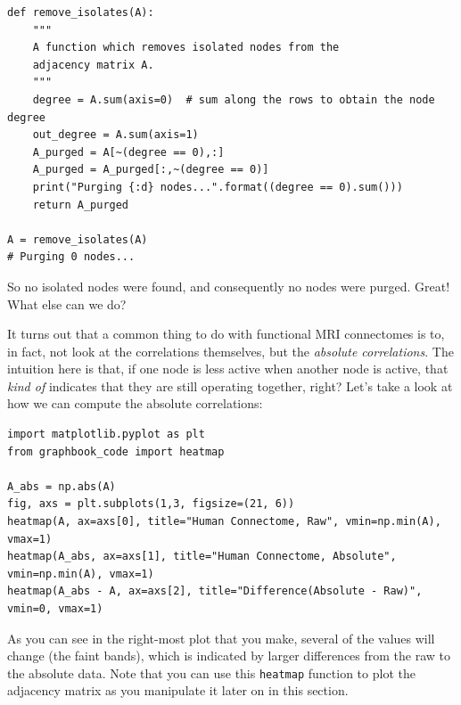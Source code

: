 \begin{lstlisting}[style=python]
def remove_isolates(A):
    """
    A function which removes isolated nodes from the 
    adjacency matrix A.
    """
    degree = A.sum(axis=0)  # sum along the rows to obtain the node degree
    out_degree = A.sum(axis=1)
    A_purged = A[~(degree == 0),:]
    A_purged = A_purged[:,~(degree == 0)]
    print("Purging {:d} nodes...".format((degree == 0).sum()))
    return A_purged
    
A = remove_isolates(A)
# Purging 0 nodes...
\end{lstlisting}

So no isolated nodes were found, and consequently no nodes were purged. Great! What else can we do?

It turns out that a common thing to do with functional MRI connectomes is to, in fact, not look at the correlations themselves, but the \emph{absolute correlations}. The intuition here is that, if one node is less active when another node is active, that \emph{kind of} indicates that they are still operating together, right? Let's take a look at how we can compute the absolute correlations:

\begin{lstlisting}[style=python]
import matplotlib.pyplot as plt
from graphbook_code import heatmap

A_abs = np.abs(A)
fig, axs = plt.subplots(1,3, figsize=(21, 6))
heatmap(A, ax=axs[0], title="Human Connectome, Raw", vmin=np.min(A), vmax=1)
heatmap(A_abs, ax=axs[1], title="Human Connectome, Absolute", vmin=np.min(A), vmax=1)
heatmap(A_abs - A, ax=axs[2], title="Difference(Absolute - Raw)", vmin=0, vmax=1)
\end{lstlisting}

As you can see in the right-most plot that you make, several of the values will change (the faint bands), which is indicated by larger differences from the raw to the absolute data. Note that you can use this \texttt{heatmap} function to plot the adjacency matrix as you manipulate it later on in this section.

